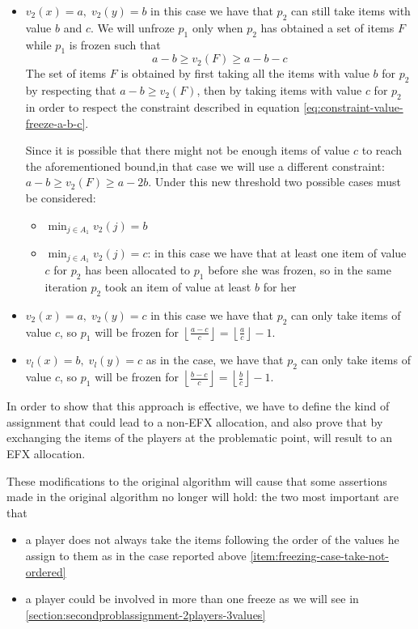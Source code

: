 \begin{itemize}
    \item \label{item:freezing-case-take-not-ordered}$v_2(x) = a,\; v_2(y) =  b$ in this case we have that $p_2$ can still take items with value $b$ and $c$. We will unfroze $p_1$ only when $p_2$ has obtained a set of items $F$ while $p_1$ is frozen such that
    \begin{equation}
        a-b\ge v_2(F)\ge a-b-c
        \label{eq:constraint-value-freeze-a-b-c}
    \end{equation}
    The set of items $F$ is obtained by first taking all the items with value $b$ for $p_2$ by respecting that $a-b\ge v_2(F)$, then by taking items with value $c$ for $p_2$ in order to respect the constraint described in equation \ref{eq:constraint-value-freeze-a-b-c}.
    
    Since it is possible that there might not be enough items of value $c$ to reach the aforementioned bound,in that case we will use a different constraint: $ a-b\ge v_2(F)\ge a-2b$. Under this new threshold two possible cases must be considered:
    \begin{itemize}
        \item $\min_{j\in A_1} v_2(j) = b$ 
        \item $\min_{j\in A_1} v_2(j) = c$: in this case we have that at least one item of value $c$ for $p_2$ has been allocated to $p_1$ before she was frozen, so in the same iteration $p_2$ took an item of value at least $b$ for her
    \end{itemize}
    \item $v_2(x) = a,\; v_2(y) =  c$ in this case we have that $p_2$ can only take items of value $c$, so $p_1$ will be frozen for $\left\lfloor \frac{a-c}{c}\right \rfloor =\left \lfloor \frac{a}{c}\right \rfloor - 1$.
    \item $v_l(x) = b,\; v_l(y) =  c$ as in the case, we have that $p_2$ can only take items of value $c$, so $p_1$ will be frozen for $\left \lfloor \frac{b-c}{c}\right \rfloor =\left  \lfloor \frac{b}{c}\right \rfloor - 1$.
\end{itemize}
In order to show that this approach is effective, we have to define the kind of assignment that could lead to a non-EFX allocation, and also prove that by exchanging the items of the players at the problematic point, will result to an EFX allocation.

These modifications to the original algorithm will cause that some assertions made in the original algorithm no longer will hold: the two most important are that 
\begin{itemize}
    \item a player does not always take the items following the order of the values he assign to them as in the case reported above \ref{item:freezing-case-take-not-ordered}
    \item a player could be involved in more than one freeze as we will see in \ref{section:secondproblassignment-2players-3values}
\end{itemize}

